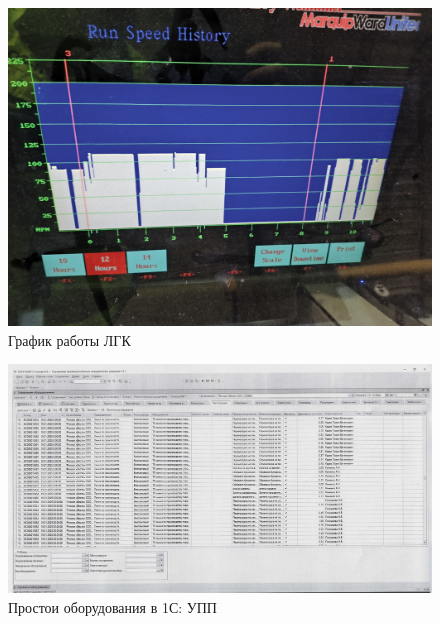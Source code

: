 \begin{figure}
\begin{center}
 \includegraphics[height=0.5\textheight, keepaspectratio]{Pics/V Остановы ГА.jpg}
\end{center}
 \caption{График работы ЛГК}
 \label{pic:V Остановы ГА}
\end{figure}

\begin{figure}
\begin{center}
 \includegraphics[height=0.37\textheight, keepaspectratio]{Pics/XII.6.jpg}
\end{center}
 \caption{Простои оборудования в 1С: УПП}
 \label{pic:XII.6.jpg}
\end{figure}

